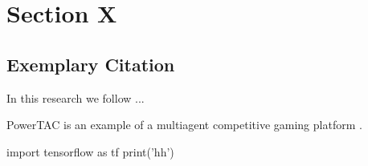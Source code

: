 \clearpage
\section{Section X}
\label{sec:Section_Name_X}

\subsection{Exemplary Citation}
\label{subsec:Section_Name_X/cite}


In this research we follow \cite{wei2016cpm}...


PowerTAC is an example of a multiagent competitive gaming platform \cite{wei2016cpm}.

\begin{python}
	import tensorflow as tf
	print('hh')
\end{python}